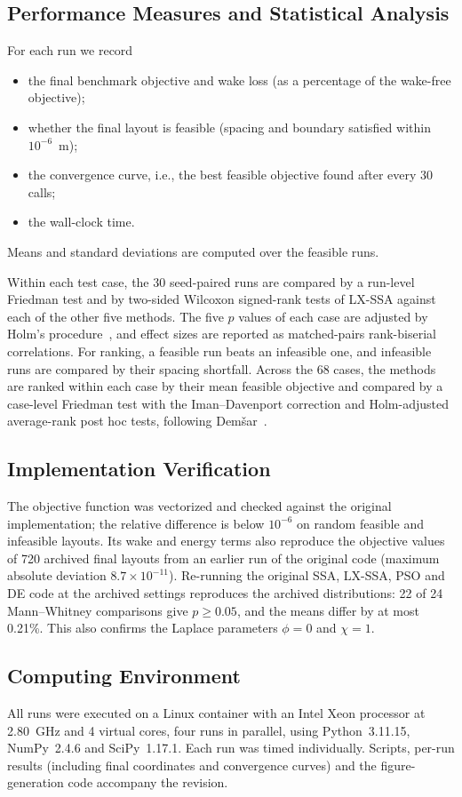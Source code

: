\subsection{Performance Measures and Statistical Analysis}
For each run we record
\begin{itemize}
\item the final benchmark objective and wake loss (as a percentage of the wake-free objective);
\item whether the final layout is feasible (spacing and boundary satisfied within $10^{-6}$~m);
\item the convergence curve, i.e., the best feasible objective found after every 30 calls;
\item the wall-clock time.
\end{itemize}
Means and standard deviations are computed over the feasible runs.

Within each test case, the 30 seed-paired runs are compared by a run-level Friedman test and by two-sided Wilcoxon signed-rank tests of LX-SSA against each of the other five methods. The five $p$ values of each case are adjusted by Holm's procedure~\cite{Holm1979}, and effect sizes are reported as matched-pairs rank-biserial correlations. For ranking, a feasible run beats an infeasible one, and infeasible runs are compared by their spacing shortfall. Across the 68 cases, the methods are ranked within each case by their mean feasible objective and compared by a case-level Friedman test with the Iman--Davenport correction and Holm-adjusted average-rank post hoc tests, following Dem\v{s}ar~\cite{Demsar2006}.

\subsection{Implementation Verification}
\label{sec:validation}
The objective function was vectorized and checked against the original implementation; the relative difference is below $10^{-6}$ on random feasible and infeasible layouts. Its wake and energy terms also reproduce the objective values of 720 archived final layouts from an earlier run of the original code (maximum absolute deviation $8.7\times10^{-11}$). Re-running the original SSA, LX-SSA, PSO and DE code at the archived settings reproduces the archived distributions: 22 of 24 Mann--Whitney comparisons give $p\ge0.05$, and the means differ by at most 0.21\%. This also confirms the Laplace parameters $\phi=0$ and $\chi=1$.

\subsection{Computing Environment}
All runs were executed on a Linux container with an Intel Xeon processor at 2.80~GHz and 4 virtual cores, four runs in parallel, using Python~3.11.15, NumPy~2.4.6 and SciPy~1.17.1. Each run was timed individually. Scripts, per-run results (including final coordinates and convergence curves) and the figure-generation code accompany the revision.

